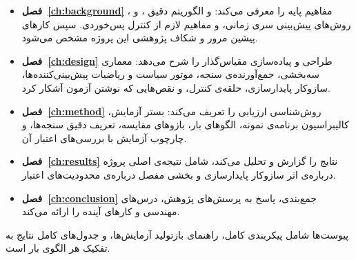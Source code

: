 \begin{itemize}
  \item \textbf{فصل~\ref{ch:background}} مفاهیم پایه را معرفی می‌کند:  و
  الگوریتم دقیق ،  و ، روش‌های پیش‌بینی سری زمانی، و
  مفاهیم لازم از کنترل پس‌خوردی. سپس کارهای پیشین مرور و شکاف پژوهشی این پروژه مشخص می‌شود.

  \item \textbf{فصل~\ref{ch:design}} طراحی و پیاده‌سازی مقیاس‌گذار را شرح می‌دهد: معماری
  سه‌بخشی، جمع‌آورنده‌ی سنجه، موتور سیاست و ریاضیات پیش‌بینی‌کننده‌ها، سازوکار پایدارسازی،
  حلقه‌ی کنترل، و نقص‌هایی که نوشتن آزمون آشکار کرد.

  \item \textbf{فصل~\ref{ch:method}} روش‌شناسی ارزیابی را تعریف می‌کند: بستر آزمایش،
  کالیبراسیون برنامه‌ی نمونه، الگوهای بار، بازوهای مقایسه، تعریف دقیق سنجه‌ها، و چارچوب
  آزمایش با بررسی‌های اعتبار آن.

  \item \textbf{فصل~\ref{ch:results}} نتایج را گزارش و تحلیل می‌کند، شامل نتیجه‌ی اصلی
  پروژه درباره‌ی اثر سازوکار پایدارسازی و بخشی مفصل درباره‌ی محدودیت‌های اعتبار.

  \item \textbf{فصل~\ref{ch:conclusion}} جمع‌بندی، پاسخ به پرسش‌های پژوهش، درس‌های مهندسی و
  کارهای آینده را ارائه می‌کند.
\end{itemize}

پیوست‌ها شامل پیکربندی کامل، راهنمای بازتولید آزمایش‌ها، و جدول‌های کامل نتایج به تفکیک هر
الگوی بار است.
